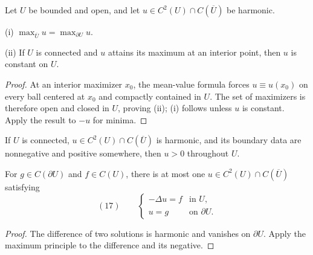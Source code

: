 \begin{theorem}
\label{thm:strong-maximum-principle-laplace}
\leanok
{}
Let $U$ be bounded and open, and let
$u\in C^2(U)\cap C(\overline U)$ be harmonic.

(i) $\max_{\overline U}u=\max_{\partial U}u$.

(ii) If $U$ is connected and $u$ attains its maximum at an interior point,
then $u$ is constant on $U$.
\end{theorem}
\begin{proof}
\leanok
\sketch At an interior maximizer $x_0$, the mean-value formula forces
$u\equiv u(x_0)$ on every ball centered at $x_0$ and compactly contained in
$U$. The set of maximizers is therefore open and closed in $U$, proving (ii);
(i) follows unless $u$ is constant. Apply the result to $-u$ for minima.
\end{proof}

\begin{remark}
\label{rem:strong-maximum-principle-positivity}
\leanok
{}
If $U$ is connected, $u\in C^2(U)\cap C(\overline U)$ is harmonic, and its
boundary data are nonnegative and positive somewhere, then $u>0$ throughout
$U$.
\end{remark}

\begin{theorem}[Uniqueness]
\label{thm:uniqueness-poisson-dirichlet}
\leanok
{}
For $g\in C(\partial U)$ and $f\in C(U)$, there is at most one
$u\in C^2(U)\cap C(\overline U)$ satisfying
$$(17)\qquad
\begin{cases}
-\Delta u=f&\text{in }U,\\
u=g&\text{on }\partial U.
\end{cases}$$
\end{theorem}
\begin{proof}
\leanok
\sketch The difference of two solutions is harmonic and vanishes on
$\partial U$. Apply the maximum principle to the difference and its negative.
\end{proof}

